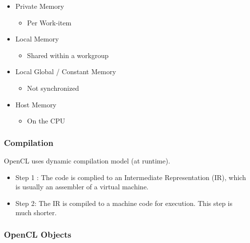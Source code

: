\begin{itemize}
\tightlist
\item
  Private Memory

  \begin{itemize}
  \tightlist
  \item
    Per Work-item
  \end{itemize}
\item
  Local Memory

  \begin{itemize}
  \tightlist
  \item
    Shared within a workgroup
  \end{itemize}
\item
  Local Global / Constant Memory

  \begin{itemize}
  \tightlist
  \item
    Not synchronized
  \end{itemize}
\item
  Host Memory

  \begin{itemize}
  \tightlist
  \item
    On the CPU
  \end{itemize}
\end{itemize}

\hypertarget{compilation}{%
\subsubsection{Compilation}\label{compilation}}

OpenCL uses dynamic compilation model (at runtime).

\begin{itemize}
\tightlist
\item
  Step 1 : The code is complied to an Intermediate Representation (IR),
  which is usually an assembler of a virtual machine.
\item
  Step 2: The IR is compiled to a machine code for execution. This step
  is much shorter.
\end{itemize}

\clearpage
\hypertarget{opencl-objects}{%
\subsubsection{OpenCL Objects}\label{opencl-objects}}

